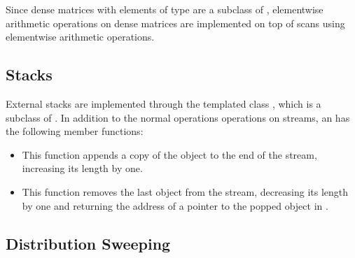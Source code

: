 Since dense matrices with elements of type  are a subclass of
, elementwise arithmetic operations on dense
matrices are implemented on top of scans using elementwise arithmetic
operations.



\subsection{Stacks}


External stacks are implemented through the templated class
, 
which is a subclass of . In
addition to the normal operations operations on streams, an
 has the following member functions:
\begin{itemize}
    \item {} This function
    appends a copy of the object  to the end of
    the stream, increasing its length by one.

    \item {} This function
    removes the last object from the stream, decreasing its
    length by one and returning the address of a pointer to
    the popped object in .
\end{itemize}

\subsection{Distribution Sweeping}

\tobewritten


